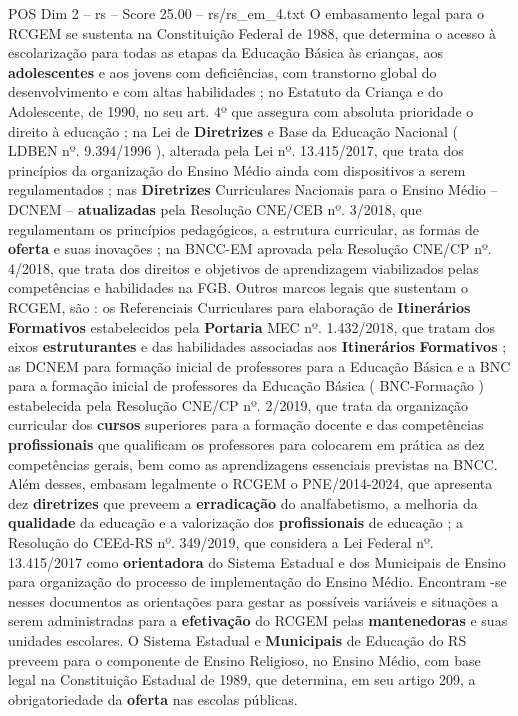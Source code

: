\begin{textsample}{POS Dim 2 – rs – Score 25.00 – rs/rs\_em\_4.txt}
O embasamento legal para o RCGEM se sustenta na Constituição Federal de 1988, que determina o acesso à escolarização para todas as etapas da Educação Básica às crianças, aos \textbf{adolescentes} e aos jovens com deficiências, com transtorno global do desenvolvimento e com altas habilidades ; no Estatuto da Criança e do Adolescente, de 1990, no seu art. 4º que assegura com absoluta prioridade o direito à educação ; na Lei de \textbf{Diretrizes} e Base da Educação Nacional ( LDBEN nº. 9.394/1996 ), alterada pela Lei nº. 13.415/2017, que trata dos princípios da organização do Ensino Médio ainda com dispositivos a serem regulamentados ; nas \textbf{Diretrizes} Curriculares Nacionais para o Ensino Médio – DCNEM – \textbf{atualizadas} pela Resolução CNE/CEB nº. 3/2018, que regulamentam os princípios pedagógicos, a estrutura curricular, as formas de \textbf{oferta} e suas inovações ; na BNCC-EM aprovada pela Resolução CNE/CP nº. 4/2018, que trata dos direitos e objetivos de aprendizagem viabilizados pelas competências e habilidades na FGB.
Outros marcos legais que sustentam o RCGEM, são : os Referenciais Curriculares para elaboração de \textbf{Itinerários} \textbf{Formativos} estabelecidos pela \textbf{Portaria} MEC nº. 1.432/2018, que tratam dos eixos \textbf{estruturantes} e das habilidades associadas aos \textbf{Itinerários} \textbf{Formativos} ; as DCNEM para formação inicial de professores para a Educação Básica e a BNC para a formação inicial de professores da Educação Básica ( BNC-Formação ) estabelecida pela Resolução CNE/CP nº. 2/2019, que trata da organização curricular dos \textbf{cursos} superiores para a formação docente e das competências \textbf{profissionais} que qualificam os professores para colocarem em prática as dez competências gerais, bem como as aprendizagens essenciais previstas na BNCC.
Além desses, embasam legalmente o RCGEM o PNE/2014-2024, que apresenta dez \textbf{diretrizes} que preveem a \textbf{erradicação} do analfabetismo, a melhoria da \textbf{qualidade} da educação e a valorização dos \textbf{profissionais} de educação ; a Resolução do CEEd-RS nº. 349/2019, que considera a Lei Federal nº. 13.415/2017 como \textbf{orientadora} do Sistema Estadual e dos Municipais de Ensino para organização do processo de implementação do Ensino Médio.
Encontram -se nesses documentos as orientações para gestar as possíveis variáveis e situações a serem administradas para a \textbf{efetivação} do RCGEM pelas \textbf{mantenedoras} e suas unidades escolares.
O Sistema Estadual e \textbf{Municipais} de Educação do RS preveem para o componente de Ensino Religioso, no Ensino Médio, com base legal na Constituição Estadual de 1989, que determina, em seu artigo 209, a obrigatoriedade da \textbf{oferta} nas escolas públicas.

\end{textsample}
